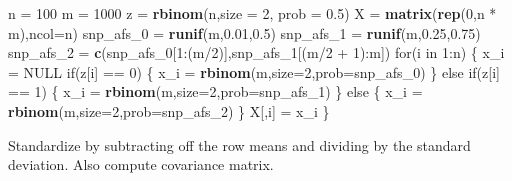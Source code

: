 \documentclass[]{article}
\newenvironment{Shaded}{\begin{snugshade}}{\end{snugshade}}
\newcommand{\KeywordTok}[1]{\textcolor[rgb]{0.13,0.29,0.53}{\textbf{{#1}}}}
\newcommand{\DataTypeTok}[1]{\textcolor[rgb]{0.13,0.29,0.53}{{#1}}}
\newcommand{\DecValTok}[1]{\textcolor[rgb]{0.00,0.00,0.81}{{#1}}}
\newcommand{\FloatTok}[1]{\textcolor[rgb]{0.00,0.00,0.81}{{#1}}}
\newcommand{\StringTok}[1]{\textcolor[rgb]{0.31,0.60,0.02}{{#1}}}
\newcommand{\CommentTok}[1]{\textcolor[rgb]{0.56,0.35,0.01}{\textit{{#1}}}}
\newcommand{\OtherTok}[1]{\textcolor[rgb]{0.56,0.35,0.01}{{#1}}}
\newcommand{\NormalTok}[1]{{#1}}
\begin{document}
\begin{Shaded}
\begin{Highlighting}[]
\NormalTok{n =}\StringTok{ }\DecValTok{100}
\NormalTok{m =}\StringTok{ }\DecValTok{1000}
\NormalTok{z =}\StringTok{ }\KeywordTok{rbinom}\NormalTok{(n,}\DataTypeTok{size =} \DecValTok{2}\NormalTok{, }\DataTypeTok{prob =} \FloatTok{0.5}\NormalTok{)}
\NormalTok{X =}\StringTok{ }\KeywordTok{matrix}\NormalTok{(}\KeywordTok{rep}\NormalTok{(}\DecValTok{0}\NormalTok{,n *}\StringTok{ }\NormalTok{m),}\DataTypeTok{ncol=}\NormalTok{n)}
\NormalTok{snp_afs_0 =}\StringTok{ }\KeywordTok{runif}\NormalTok{(m,}\FloatTok{0.01}\NormalTok{,}\FloatTok{0.5}\NormalTok{)}
\NormalTok{snp_afs_1 =}\StringTok{ }\KeywordTok{runif}\NormalTok{(m,}\FloatTok{0.25}\NormalTok{,}\FloatTok{0.75}\NormalTok{)}
\NormalTok{snp_afs_2 =}\StringTok{ }\KeywordTok{c}\NormalTok{(snp_afs_0[}\DecValTok{1}\NormalTok{:(m/}\DecValTok{2}\NormalTok{)],snp_afs_1[(m/}\DecValTok{2} \NormalTok{+}\StringTok{ }\DecValTok{1}\NormalTok{):m])}
\NormalTok{for(i in }\DecValTok{1}\NormalTok{:n) \{}
  \NormalTok{x_i =}\StringTok{ }\OtherTok{NULL}
  \NormalTok{if(z[i] ==}\StringTok{ }\DecValTok{0}\NormalTok{) \{}
    \NormalTok{x_i =}\StringTok{ }\KeywordTok{rbinom}\NormalTok{(m,}\DataTypeTok{size=}\DecValTok{2}\NormalTok{,}\DataTypeTok{prob=}\NormalTok{snp_afs_0)}
  \NormalTok{\} else if(z[i] ==}\StringTok{ }\DecValTok{1}\NormalTok{) \{}
    \NormalTok{x_i =}\StringTok{ }\KeywordTok{rbinom}\NormalTok{(m,}\DataTypeTok{size=}\DecValTok{2}\NormalTok{,}\DataTypeTok{prob=}\NormalTok{snp_afs_1)}
  \NormalTok{\} else \{}
    \NormalTok{x_i =}\StringTok{ }\KeywordTok{rbinom}\NormalTok{(m,}\DataTypeTok{size=}\DecValTok{2}\NormalTok{,}\DataTypeTok{prob=}\NormalTok{snp_afs_2)}
  \NormalTok{\}}
  \NormalTok{X[,i] =}\StringTok{ }\NormalTok{x_i}
\NormalTok{\}}
\end{Highlighting}
\end{Shaded}

Standardize by subtracting off the row means and dividing by the
standard deviation. Also compute covariance matrix.

\begin{Shaded}
\end{Shaded}
\end{document}
